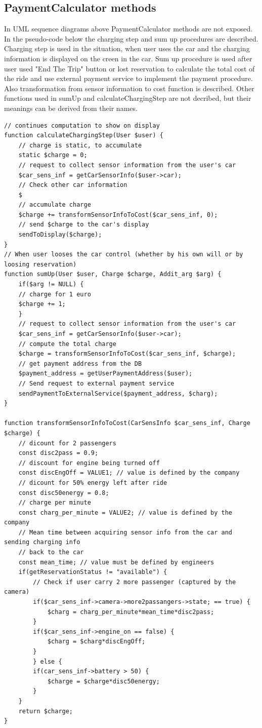 \documentclass[12pt, letterpaper]{article}
\begin{document}
\subsection{PaymentCalculator methods}
In UML sequence diagrams above PaymentCalculator methods are not exposed. \\
In the pseudo-code below the charging step and sum up procedures are described. Charging step is used in the situation, when user uses the car and the charging information is displayed on the creen in the car. Sum up procedure is used after user used "End The Trip" button or lost reservation to calculate the total cost of the ride and use external payment service to implement the payment procedure. \\
Also transformation from sensor information to cost function is described. Other functions used in sumUp and calculateChargingStep are not decribed, but their meanings can be derived from their names.

\begin{lstlisting}[basicstyle=\footnotesize, tabsize=1]
// continues computation to show on display
function calculateChargingStep(User $user) { 
	// charge is static, to accumulate
	static $charge = 0;
	// request to collect sensor information from the user's car
	$car_sens_inf = getCarSensorInfo($user->car);
	// Check other car information
	$
	// accumulate charge
	$charge += transformSensorInfoToCost($car_sens_inf, 0);
	// send $charge to the car's display
	sendToDisplay($charge);
}   
// When user looses the car control (whether by his own will or by loosing reservation)
function sumUp(User $user, Charge $charge, Addit_arg $arg) { 
	if($arg != NULL) {
	// charge for 1 euro 
	$charge += 1;
	}
	// request to collect sensor information from the user's car
	$car_sens_inf = getCarSensorInfo($user->car);
	// compute the total charge
	$charge = transformSensorInfoToCost($car_sens_inf, $charge);
	// get payment address from the DB 
	$payment_address = getUserPaymentAddress($user);
	// Send request to external payment service
	sendPaymentToExternalService($payment_address, $charg);
}

function transformSensorInfoToCost(CarSensInfo $car_sens_inf, Charge $charge) {
	// dicount for 2 passengers
	const disc2pass = 0.9;
	// discount for engine being turned off
	const discEngOff = VALUE1; // value is defined by the company 
	// dicount for 50% energy left after ride
	const disc50energy = 0.8;
	// charge per minute
	const charg_per_minute = VALUE2; // value is defined by the company
	// Mean time between acquiring sensor info from the car and sending charging info 
	// back to the car
	const mean_time; // value must be defined by engineers
	if(getReservationStatus != "available") {
		// Check if user carry 2 more passenger (captured by the camera) 
		if($car_sens_inf->camera->more2passangers->state; == true) {
			$charg = charg_per_minute*mean_time*disc2pass;
		}
		if($car_sens_inf->engine_on == false) {
			$charg = $charg*discEngOff;
		}
		} else {
		if(car_sens_inf->battery > 50) {
			$charge = $charge*disc50energy;
		}
	}
	return $charge;
}


\end{lstlisting}
\end{document}

